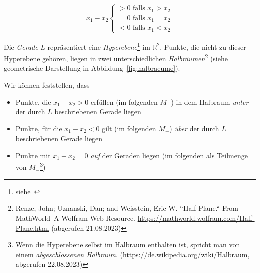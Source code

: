 \begin{equation}
x_1 - x_2 \begin{cases}
               > 0 \text{ falls } x_1 > x_2 \\
               = 0 \text{ falls } x_1 = x_2 \\
               < 0 \text{ falls } x_1 < x_2
\end{cases}
\end{equation}

Die \textit{Gerade} $L$ repräsentiert eine \textit{Hyperebene}\footnote{
    siehe~\cite[81, Definition 2.3]{BHW+12}
} im $\mathbb{R}^2$.
Punkte, die nicht zu dieser Hyperebene gehören, liegen in zwei unterschiedlichen \textit{Halbräumen}\footnote{
    Renze, John; Uznanski, Dan; and Weisstein, Eric W. ``Half-Plane.`` From MathWorld--A Wolfram Web Resource. \url{https://mathworld.wolfram.com/Half-Plane.html} (abgerufen 21.08.2023)
} (siehe geometrische Darstellung in Abbildung~\ref{fig:halbraeume}).

Wir können feststellen, dass


\begin{itemize}
    \item Punkte, die $x_1 - x_2 > 0$ erfüllen (im folgenden $M_-$) in dem Halbraum \textit{unter} der durch $L$ beschriebenen Gerade liegen
    \item Punkte, für die  $x_1 - x_2 < 0$ gilt (im folgenden $M_+$) \textit{über} der durch $L$ beschriebenen Gerade liegen
    \item Punkte mit $x_1 - x_2 = 0$ \textit{auf} der Geraden liegen (im folgenden als Teilmenge von $M_-$\footnote{
        Wenn die Hyperebene selbst im Halbraum enthalten ist, spricht man von einem \textit{abgeschlossenen Halbraum}. (\url{https://de.wikipedia.org/wiki/Halbraum}, abgerufen 22.08.2023)
    })
\end{itemize}


